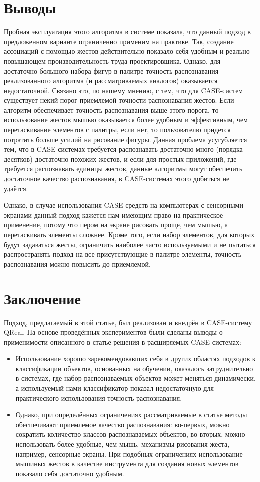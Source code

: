 \documentclass[a5paper]{article}
\begin{document}
\section{Выводы}
Пробная эксплуатация этого алгоритма в системе показала, что данный подход в предложенном варианте ограниченно применим на практике. Так, создание ассоциаций с помощью жестов действительно показало себя удобным и реально повышающем производительность труда проектировщика. Однако, для достаточно большого набора фигур 
в палитре точность распознавания реализованного алгоритма (и рассматриваемых аналогов) оказывается недостаточной. 
Связано это, по нашему мнению, с тем, что для CASE-систем существует некий порог приемлемой точности распознавания жестов. Если
алгоритм обеспечивает точность распознавания выше этого порога, то использование жестов мышью оказывается более удобным и эффективным,
чем перетаскивание элементов с палитры, если нет, то пользователю придется потратить больше усилий на рисование фигуры.
Данная проблема усугубляется тем, что в CASE-системах требуется распознавать достаточно много (порядка десятков) достаточно 
похожих жестов, и если для простых приложений, где требуется распознавать единицы жестов, данные алгоритмы могут обеспечить
достаточное качество распознавания, в CASE-системах этого добиться не удаётся.

Однако, в случае использования CASE-средств на компьютерах с сенсорными экранами данный подход кажется нам имеющим право на 
практическое применение, потому что пером на экране рисовать проще, чем мышью, а перетаскивать элементы сложнее. Кроме того, если набор элементов,
для которых будут задаваться жесты, ограничить наиболее часто используемыми и не пытаться распространять подход на все 
присутствующие в палитре элементы, точность распознавания можно повысить до приемлемой.

\section{Заключение}
Подход, предлагаемый в этой статье, был реализован и внедрён в CASE-систему QReal. На основе проведённых экспериментов были сделаны выводы о применимости описанного в статье решения в расширяемых CASE-системах: 
\begin{itemize}
  \item Использование хорошо зарекомендовавших себя в других областях подходов к классификации объектов, основанных на обучении, оказалось затруднительно в системах, где набор распознаваемых объектов может меняться динамически, а используемый нами классификатор показал недостаточную для практического использования точность распознавания.
  \item Однако, при определённых ограничениях рассматриваемые в статье методы обеспечивают приемлемое качество распознавания: во-первых, можно сократить количество классов  распознаваемых объектов, во-вторых, можно использовать более удобные, чем мышь, механизмы рисования жеста, например, сенсорные экраны. При подобных ограничениях использование мышиных жестов в качестве инструмента для создания новых элементов показало себя достаточно удобным.
\end{itemize}
\end{document}
